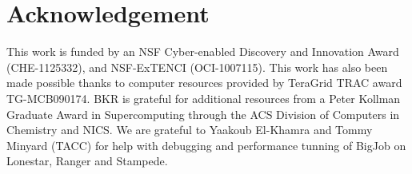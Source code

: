 \documentclass{sig-alternate}
\begin{document}
\section*{Acknowledgement} {\footnotesize This work is funded by an
  NSF Cyber-enabled Discovery and Innovation Award (CHE-1125332), and
  NSF-ExTENCI (OCI-1007115). This work has also been made possible
  thanks to computer resources provided by TeraGrid TRAC award
  TG-MCB090174.  BKR is grateful for additional resources from a Peter
  Kollman Graduate Award in Supercomputing through the ACS Division of
  Computers in Chemistry and NICS. We are grateful to Yaakoub
  El-Khamra and Tommy Minyard (TACC) for help with debugging and
  performance tunning of BigJob on Lonestar, Ranger and Stampede.}

%
%

\end{document}
